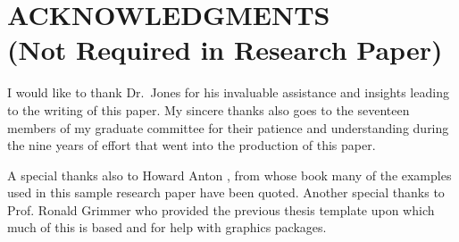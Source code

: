 


\chapter*{ACKNOWLEDGMENTS\\
\small (Not Required in Research Paper)}

I would like to thank Dr.\ Jones for his invaluable assistance and
insights leading to the writing of this paper.  My sincere thanks
also goes to the seventeen members of my graduate committee for their
patience and understanding during the nine years of effort that
went into the production of this paper.


A special thanks also to Howard Anton \cite{Anton}, from whose
book many of the examples used in this sample research paper have
been quoted. Another special thanks to Prof. Ronald Grimmer who
provided the previous thesis template upon which much of this is
based and for help with graphics packages.

\newpage
